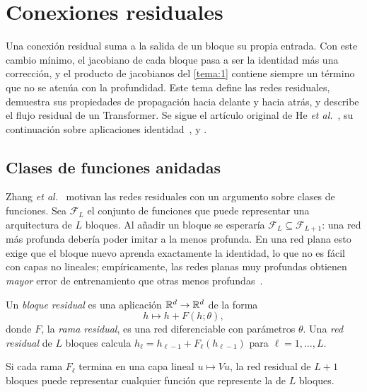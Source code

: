 \chapter{Conexiones residuales}
\label{tema:2}

Una conexión residual suma a la salida de un bloque su propia entrada. Con este cambio mínimo, el jacobiano de cada bloque pasa a ser la identidad más una corrección, y el producto de jacobianos del \cref{tema:1} contiene siempre un término que no se atenúa con la profundidad. Este tema define las redes residuales, demuestra sus propiedades de propagación hacia delante y hacia atrás, y describe el flujo residual de un Transformer. Se sigue el artículo original de He \emph{et al.}~\cite{resnet}, su continuación sobre aplicaciones identidad~\cite{resnet-id}, \cite[§8.6]{d2l} y \cite[§9.5]{bishopdl}.

\section{Clases de funciones anidadas}

Zhang \emph{et al.}~\cite[§8.6.1]{d2l} motivan las redes residuales con un argumento sobre clases de funciones. Sea $\mathcal{F}_L$ el conjunto de funciones que puede representar una arquitectura de $L$ bloques. Al añadir un bloque se esperaría $\mathcal{F}_L\subseteq\mathcal{F}_{L+1}$: una red más profunda debería poder imitar a la menos profunda. En una red plana esto exige que el bloque nuevo aprenda exactamente la identidad, lo que no es fácil con capas no lineales; empíricamente, las redes planas muy profundas obtienen \emph{mayor} error de entrenamiento que otras menos profundas~\cite{resnet}.

\begin{definicion}\label{def:residual}
Un \emph{bloque residual} es una aplicación $\mathbb{R}^{d}\to\mathbb{R}^{d}$ de la forma
\[
h\longmapsto h+F(h;\theta),
\]
donde $F$, la \emph{rama residual}, es una red diferenciable con parámetros $\theta$. Una \emph{red residual} de $L$ bloques calcula $h_\ell=h_{\ell-1}+F_\ell(h_{\ell-1})$ para $\ell=1,\dots,L$.
\end{definicion}

\begin{proposicion}[Anidamiento]\label{prop:anidamiento}
Si cada rama $F_\ell$ termina en una capa lineal $u\mapsto Vu$, la red residual de $L+1$ bloques puede representar cualquier función que represente la de $L$ bloques.
\end{proposicion}

